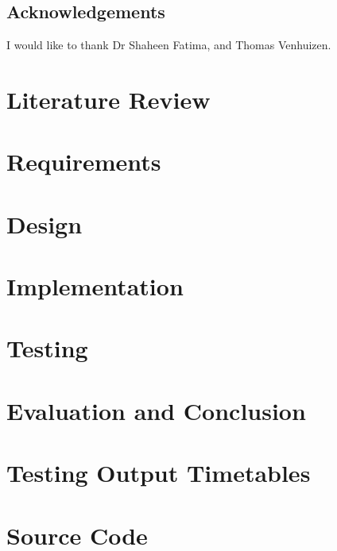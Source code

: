 \documentclass[a4paper, 12pt]{report}
\begin{document}
\section*{Acknowledgements}

I would like to thank Dr Shaheen Fatima, and Thomas Venhuizen.


\tableofcontents


\newpage

\chapter{Literature Review}


\chapter{Requirements}


\chapter{Design}


\chapter{Implementation}
 

\chapter{Testing}


\chapter{Evaluation and Conclusion}


\renewcommand\bibname{References}


\appendix

\listoffigures

\listoftables

\listoflistings

\chapter{Testing Output Timetables}


\chapter{Source Code}

\end{document}
